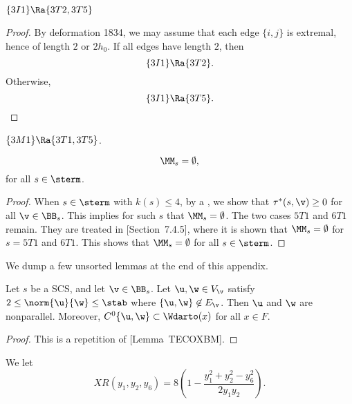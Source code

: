 \begin{lemma}[]
$\{3I1\}\Ra \{3T2,3T5\}$
\end{lemma}

\begin{proof} By deformation 1834,  we may assume that each edge $\{i,j\}$ is extremal, hence
of length $2$ or $2h_0$.  If all edges have length $2$, then
\[
\{3I1\}\Ra\{3T2\}.
\]
Otherwise,
\[
\{3I1\}\Ra\{3T5\}.
\]
\end{proof}

\begin{lemma}[]
$\{3M1\}\Ra \{3T1,3T5\}$.
\end{lemma}


\begin{lemma}\label{lemma:sterm-empty}
\[
\MM_s=\emptyset,
\]
for all $s\in\sterm$.
\end{lemma}

\begin{proof}
When $s\in \sterm$
with $k(s)\le 4$, by a , we show
that $\tau^*(s,\v) \ge0$ for all $\v\in \BB_s$.  This implies for such $s$
that $\MM_s=\emptyset$.  The two cases $5T1$ and $6T1$ remain.
They are treated in \cite{DSP}[Section~7.4.5],%
where it is shown
that $\MM_s=\emptyset$ for $ s=5T1$ and $6T1$.  This
shows that $\MM_s=\emptyset$ for all $s\in \sterm$.
\end{proof}


We dump a few unsorted lemmas at the end of this appendix.

\begin{lemma}[]\label{lemma:2hm-slice1}
Let $s$ be a SCS, and let $\v\in \BB_s$.
Let $\u,\w\in V_\v$ satisfy $2\le\norm{\u}{\w}\le \stab$ where
$\{\u,\w\}\not\in E_\v$.  Then $\u$ and $\w$ are nonparallel.
Moreover,
$C^0\{\u,\w\}\subset \Wdarto(x)$ for all $x\in F$.
\end{lemma}


\begin{proof}  This is a repetition of \cite{DSP}[Lemma~TECOXBM].%
\end{proof}

\begin{definition}[$XR$]
We let
\[
XR(y_1,y_2,y_6) = 8 (1 - \frac{y_1^2 + y_2^2 - y_6^2}{2 y_1 y_2}).
\]
\end{definition}

